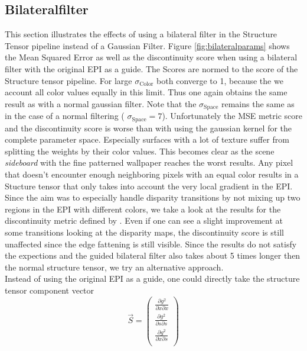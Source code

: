 \documentclass  [
  paper    = a4,
  BCOR     = 10mm,
  twoside,
  fontsize = 12pt,
  fleqn,
  toc      = bibnumbered,
  toc      = listofnumbered,
  numbers  = noendperiod,
  headings = normal,
  listof   = leveldown,
  version  = 3.03
]                                       {scrreprt}
\begin{document}
\subsection{Bilateralfilter}
 This section illustrates the effects of using a bilateral filter in the Structure Tensor pipeline instead of a Gaussian Filter. Figure \ref{fig:bilateralparams} shows the Mean Squared Error as well as the discontinuity score when using a bilateral filter with the original EPI as a guide. The Scores are normed to the score of the Structure tensor pipeline. For large $\sigma_\text{Color}$ both converge to 1, because the we account all color values equally in this limit. Thus one again obtains the same result as with a normal gaussian filter. Note that the $\sigma_\text{Space}$ remains the same as in the case of a normal filtering ( $\sigma_\text{Space}=7$). Unfortunately the MSE metric score and the discontinuity score is worse than with using the gaussian kernel for the complete parameter space. Especially surfaces with a lot of texture suffer from splitting the weights by their color values. This becomes clear as the scene \textit{sideboard} with the fine patterned wallpaper reaches the worst results. Any pixel that doesn't encounter enough neighboring pixels with an equal color results in a Stucture tensor that only takes into account the very local gradient in the EPI. Since the aim was to especially handle disparity transitions by not mixing up two regions in the EPI with different colors, we take a look at the results for the discontinuity metric defined by \cite{honauer2016benchmark}. Even if one can see a slight improvement at some transitions looking at the disparity maps, the discontinuity score is still unaffected since the edge fattening is still visible. Since the results do not satisfy the expections and the guided bilateral filter also takes about 5 times longer then the normal structure tensor, we try an alternative approach.\\
 Instead of using the original EPI as a guide, one could directly take the structure tensor component vector 
 \begin{equation}\label{key}
 \vec S = \left(\begin{matrix}
 \frac{\partial g^2}{\partial x \partial x} \\
 \frac{\partial g^2}{\partial s \partial s} \\
 \frac{\partial g^2}{\partial x \partial s} \\
 \end{matrix}\right)
 \end{equation}
\end{document}
